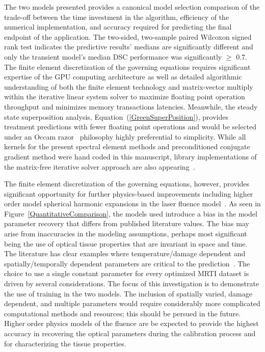 \documentclass[12pt]{article}
\newcommand{\eqn}[1]{(\ref{#1})}
\begin{document}
The two models presented provides a canonical model selection comparison of the
trade-off between the time investment in the algorithm, efficiency of the
numerical implementation, and accuracy required for predicting the final endpoint
of the application. The two-sided, two-sample paired Wilcoxon signed rank test
indicates the predictive results' medians are significantly different and
only the transient model's median DSC performance was significantly
$\geq$ 0.7. 
The finite element discretization of the governing equations requires significant
expertise of the GPU computing architecture as well as detailed algorithmic
understanding of both the finite element technology and matrix-vector multiply
within the iterative linear system solver to maximize floating point operation
throughput and minimizes memory transactions latencies.
Meanwhile, the steady state superposition analysis, Equation~\eqn{GreenSuperPosition},
provides treatment predictions with fewer floating point operations and would be selected under an Occam
razor~\cite{jaynes2003probability} philosophy highly preferential to simplicity.
While all kernels
for the present spectral element methods and preconditioned conjugate gradient
method were hand coded in this manuscript, library implementations of the
matrix-free iterative solver approach are also
appearing~\cite{Knepley2013,Knepley2014}. 


The finite element discretization of the governing equations, however, 
provides significant opportunity for further
physics-based improvements including 
higher order model spherical harmonic expansions in the laser fluence 
model~\cite{carp2004radiative}. 
As seen in Figure~\ref{QuantitativeComparison}, the models used
introduce a bias in the model parameter
recovery that differs from published literature values.
{\color{red}The bias may arise from inaccuracies in the modeling assumptions, perhaps
most significant being the use of optical tissue properties that are
invariant in space and time. The literature has clear examples
where temperature/damage dependent and spatially/temporally dependent
parameters are critical to the
prediction~\cite{Mohammed05,Schutt2008}.
The choice to use a single constant parameter for every
optimized MRTI dataset is driven by
several considerations. The focus of this investigation
is to demonstrate the use of training in the two models.
The inclusion of spatially varied, damage dependent, and
multiple parameters would require considerably more
complicated computational methods and resources; this
should be persued in the future. Higher order physics
models of the fluence are be expected to provide the highest accuracy in
recovering the optical parameters during the calibration process and for
characterizing the tissue properties. }
\end{document}
